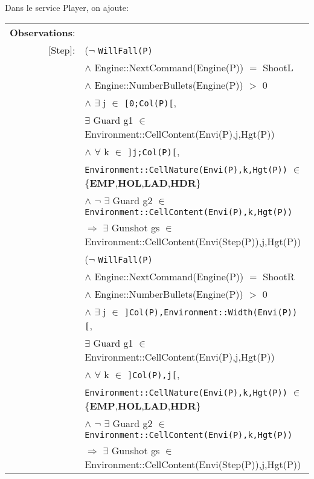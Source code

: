 \documentclass[8pt]{article}
\begin{document}
Dans le service \textrm{Player}, on ajoute:
{\small
  \begin{longtable}{rl}
    \textbf{Observations}:&\\
    \textrm{[Step]}: & ($\neg$ \texttt{WillFall(P)} \\
    & \quad\quad $\land$ \textrm{Engine::NextCommand(Engine(P))} $=$ ShootL \\
    & \quad\quad $\land$ \textrm{Engine::NumberBullets(Engine(P))} $>$ 0 \\
    & \quad\quad $\land$ $\exists$ j $\in$ \texttt{[0;Col(P)[},\\
    & \quad\quad\quad\quad $\exists$ Guard g1 $\in$ \textrm{Environment::CellContent(Envi(P),j,Hgt(P))}\\
    & \quad\quad\quad\quad $\land$ $\forall$ k $\in$ \texttt{]j;Col(P)[},\\
    & \quad\quad\quad\quad\quad\quad \texttt{Environment::CellNature(Envi(P),k,Hgt(P))} $\in$ \{\textbf{EMP},\textbf{HOL},\textbf{LAD},\textbf{HDR}\}\\
    & \quad\quad\quad\quad\quad\quad $\land$ $\neg$ $\exists$ Guard g2 $\in$ \texttt{Environment::CellContent(Envi(P),k,Hgt(P))}\\
    & \quad\quad $\Rightarrow$ $\exists$ Gunshot gs $\in$ \textrm{Environment::CellContent(Envi(Step(P)),j,Hgt(P))}\\

    & ($\neg$ \texttt{WillFall(P)} \\
    & \quad\quad $\land$ \textrm{Engine::NextCommand(Engine(P))} $=$ ShootR \\
    & \quad\quad $\land$ \textrm{Engine::NumberBullets(Engine(P))} $>$ 0 \\
    & \quad\quad $\land$ $\exists$ j $\in$ \texttt{]Col(P),Environment::Width(Envi(P))[},\\
    & \quad\quad\quad\quad $\exists$ Guard g1 $\in$ \textrm{Environment::CellContent(Envi(P),j,Hgt(P))}\\
    & \quad\quad\quad\quad $\land$ $\forall$ k $\in$ \texttt{]Col(P),j[},\\
    & \quad\quad\quad\quad\quad\quad \texttt{Environment::CellNature(Envi(P),k,Hgt(P))} $\in$ \{\textbf{EMP},\textbf{HOL},\textbf{LAD},\textbf{HDR}\}\\
    & \quad\quad\quad\quad\quad\quad $\land$ $\neg$ $\exists$ Guard g2 $\in$ \texttt{Environment::CellContent(Envi(P),k,Hgt(P))}\\
    & \quad\quad $\Rightarrow$ $\exists$ Gunshot gs $\in$ \textrm{Environment::CellContent(Envi(Step(P)),j,Hgt(P))}\\
  \end{longtable}}
\end{document}
